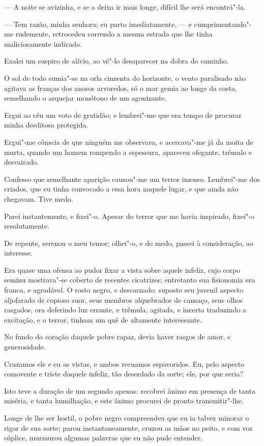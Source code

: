 --- A noite se avizinha, e se a deixa ir mais longe, difícil lhe será
encontrá"-la.

--- Tem razão, minha senhora; eu parto imediatamente, --- e
cumprimentando"-me rudemente, retrocedeu correndo a mesma estrada que lhe
tinha maliciosamente indicado.

Exalei um suspiro de alívio, ao vê"-lo desaparecer na dobra do caminho.

O sol de todo sumia"-se na orla cinzenta do horizonte, o vento paralisado
não agitava as franças dos anosos arvoredos, só o mar gemia ao longe da
costa, semelhando o arquejar monótono de um agonizante.

Ergui ao céu um voto de gratidão; e lembrei"-me que era tempo de procurar
minha desditosa protegida.

Ergui"-me cônscia de que ninguém me observava, e acercava"-me já da moita
de murta, quando um homem rompendo a espessura, apareceu ofegante,
trêmulo e desvairado.

Confesso que semelhante aparição causou"-me um terror imenso. Lembrei"-me
dos criados, que eu tinha convocado a essa hora naquele lugar, e que
ainda não chegavam. Tive medo.

Parei instantemente, e fixei"-o. Apesar do terror que me havia inspirado,
fixei"-o resolutamente.

De repente, serenou o meu temor; olhei"-o, e do medo, passei à
consideração, ao interesse.

Era quase uma ofensa ao pudor fixar a vista sobre aquele infeliz, cujo
corpo seminu mostrava"-se coberto de recentes cicatrizes; entretanto sua
fisionomia era franca, e agradável. O rosto negro, e descarnado; suposto
seu juvenil aspecto aljofarado de copioso suor, seus membros alquebrados
de cansaço, seus olhos rasgados, ora deferindo luz errante, e trêmula,
agitada, e incerta traduzindo a excitação, e o terror, tinham um quê de
altamente interessante.

No fundo do coração daquele pobre rapaz, devia haver rasgos de amor, e
generosidade.

Cruzamos ele e eu as vistas, e ambos recuamos espavoridos. Eu, pelo
aspecto comovente e triste daquele infeliz, tão deserdado da sorte; ele,
por que seria?

Isto teve a duração de um segundo apenas: recobrei ânimo em presença de
tanta miséria, e tanta humilhação, e este ânimo procurei de pronto
transmitir"-lhe.

Longe de lhe ser hostil, o pobre negro compreendeu que eu ia talvez
minorar o rigor de sua sorte; parou instantaneamente, cruzou as mãos no
peito, e com voz súplice, murmurou algumas palavras que eu não pude
entender.


